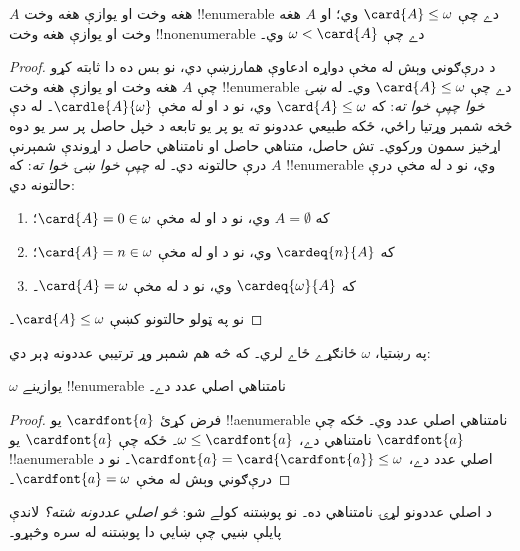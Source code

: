 \documentclass[../../../include/open-logic-section]{subfiles}
\begin{document}
\begin{prop}
$A$ هغه وخت او يوازې هغه وخت !!{enumerable} دے چې
$\card{A} \leq \omega$ وي؛ او $A$ هغه وخت او يوازې هغه وخت
!!{nonenumerable} دے چې $\omega < \card{A}$ وي۔
\end{prop}

\begin{proof}
د درې‌ګوني وېش له مخې دواړه ادعاوې همارزښې دي، نو بس ده دا
ثابته کړو چې $A$ هغه وخت او يوازې هغه وخت !!{enumerable} دے
چې $\card{A} \leq \omega$ وي۔ له \emph{ښۍ خوا چپې خوا ته}:
که $\card{A} \leq \omega$ وي، نو د
 او
 له مخې $\cardle{A}{\omega}$۔ له
دې څخه شمېر وړتيا راځي، ځکه طبيعي عددونو ته يو پر يو تابعه
د خپل حاصل پر سر يو دوه اړخيز سمون ورکوي۔ تش حاصل، متناهي
حاصل او نامتناهي حاصل د اړوندې شمېرنې درې حالتونه دي۔ له
\emph{چپې خوا ښۍ خوا ته}: که $A$ !!{enumerable} وي، نو د
 له مخې درې حالتونه دي:
\begin{enumerate}
	\item که $A = \emptyset$ وي، نو د 
	او  له مخې
	$\card{A} = 0 \in \omega$؛
	\item که $\cardeq{n}{A}$ وي، نو د 
	او  له مخې
	$\card{A} = n \in \omega$؛
	\item که $\cardeq{\omega}{A}$ وي، نو د 
	له مخې $\card{A} = \omega$۔
\end{enumerate}
نو په ټولو حالتونو کښې $\card{A} \leq \omega$۔
\end{proof}
\noindent
په رښتيا، $\omega$ ځانګړے ځاے لري۔ که څه هم شمېر وړ ترتيبي
عددونه ډېر دي:

\begin{cor}
$\omega$ يوازينے !!{enumerable} نامتناهي اصلي عدد دے۔
\end{cor}

\begin{proof}
فرض کړئ $\cardfont{a}$ يو !!a{enumerable} نامتناهي اصلي عدد
وي۔ ځکه چې $\cardfont{a}$ نامتناهي دے، $\omega \leq
\cardfont{a}$۔ ځکه چې $\cardfont{a}$ يو !!a{enumerable} اصلي
عدد دے، $\cardfont{a} = \card{\cardfont{a}} \leq \omega$۔ نو
د درې‌ګوني وېش له مخې $\cardfont{a} = \omega$۔
\end{proof}

د اصلي عددونو لړۍ نامتناهي ده۔ نو پوښتنه کولے شو: \emph{څو
اصلي عددونه شته؟} لاندې پايلې ښيي چې ښايي دا پوښتنه له سره
وڅېړو۔
\end{document}
